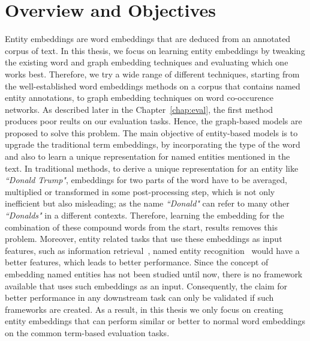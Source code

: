 \section{Overview and Objectives}\label{sec:entity_overview}
Entity embeddings are word embeddings that are deduced from an annotated corpus of text. In this thesis, we focus on learning entity embeddings by tweaking the existing word and graph embedding techniques and evaluating which one works best. Therefore, we try a wide range of different techniques, starting from the well-established word embeddings methods on a corpus that contains named entity annotations, to graph embedding techniques on word co-occurence networks. As described later in the Chapter~\ref{chap:eval}, the first method produces poor reults on our evaluation tasks. Hence, the graph-based models are proposed to solve this problem. The main objective of entity-based models is to upgrade the traditional term embeddings, by incorporating the type of the word and also to learn a unique representation for named entities mentioned in the text. In traditional methods, to derive a unique representation for an entity like \emph{``Donald Trump"}, embeddings for two parts of the word have to be averaged, multiplied or transformed in some post-processing step, which is not only inefficient but also misleading; as the name \emph{``Donald"} can refer to many other \emph{``Donalds"} in a different contexts. Therefore, learning the embedding for the combination of these compound words from the start, results removes this problem. Moreover, entity related tasks that use these embeddings as input features, such as information retrieval~, named entity recognition~ would have a better features, which leads to better performance. Since the concept of embedding named entities has not been studied until now, there is no framework available that uses such embeddings as an input. Consequently, the claim for better performance in any downstream task can only be validated if such frameworks are created. As a result, in this thesis we only focus on creating entity embeddings that can perform similar or better to normal word embeddings on the common term-based evaluation tasks. \\
